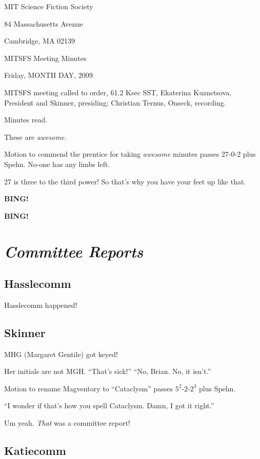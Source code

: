 \documentclass[10pt]{article}
\newcommand{\bing}{{\bf BING!} }
\newcommand{\goto}[1]{\bing \vskip 12pt \section*{{\em{#1}}}}
\newcommand{\ps}{ plus Spehn\xspace}
\begin{document}
\begin{center}

MIT Science Fiction Society

84 Massachusetts Avenue

Cambridge, MA 02139

\vspace{12pt}

MITSFS Meeting Minutes

Friday, MONTH DAY, 2009

\end{center}

\vspace{18pt}

\setlength{\parskip}{6pt}

\noindent
MITSFS meeting called to order, 61.2 Ksec SST,
Ekaterina Kuznetsova, President and Skinner, presiding; Christian Ternus, Onseck, recording.

Minutes read.

These are \emph{awesome.}

Motion to commend the prentice for taking \emph{awesome} minutes
passes 27-0-2\ps.  No-one has any limbs left.

27 is three to the third power!  So that's why you have your feet up like that.

\bing

\goto{Committee Reports}

\subsection*{Hasslecomm}

Hasslecomm happened!

\subsection*{Skinner}

MHG (Margaret Gentile) got keyed! 

Her initials are not MGH.  ``That's sick!''  ``No, Brian.  No, it
isn't.''

Motion to rename Magventory to ``Cataclysm'' passes $5^2$-2-$2^3$\ps.

``I wonder if that's how you spell Cataclysm.  Damn, I got it right.''

Um yeah.  \emph{That} was a committee report!

\subsection*{Katiecomm}
\end{document}
